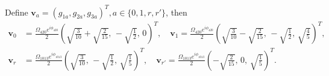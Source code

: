 \begin{lemma}
    \label{lemma:proportion-of-Omega}
   Define $\mathbf v_a=(g_{1a},g_{2a},g_{3a})^T, a\in\{0,1,r,r'\}$, then
   \begin{align}
\mathbf v_0
&=\frac{\Omega_{420}e^{i\phi_{\mathrm{420}}}}{2}
\left(\sqrt{\frac{3}{10}}+\sqrt{\frac{2}{15}},\,
-\sqrt{\frac12},\,0\right)^T, \quad
\mathbf v_1
=\frac{\Omega_{420}e^{i\phi_{\mathrm{420}}}}{2}
\left(\sqrt{\frac{3}{10}}-\sqrt{\frac{2}{15}},\,
-\sqrt{\frac12},\,\sqrt{\frac45}\right)^T,\\
\mathbf v_r
&=\frac{\Omega_{1013}e^{i\phi_{\mathrm{1013}}}}{2}
\left(\sqrt{\frac{3}{10}},\,-\sqrt{\frac12},\,\sqrt{\frac15}\right)^T, \quad
\mathbf v_{r'}
=\frac{\Omega_{1013}e^{i\phi_{\mathrm{1013}}}}{2}
\left(-\sqrt{\frac{2}{15}},\,0,\,\sqrt{\frac15}\right)^T.
\end{align}
\end{lemma}
